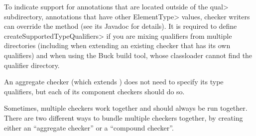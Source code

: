 To indicate support for annotations that are located outside of the \<qual>
subdirectory, annotations that have other \<ElementType> values,
checker writers can override the
method (see its Javadoc for details).
It is required to define \<createSupportedTypeQualifiers> if you are mixing
qualifiers from multiple directories (including when extending an existing
checker that has its own qualifiers) and when using the Buck build tool,
whose classloader cannot find the qualifier directory.

An aggregate checker (which extends
) does not need to specify its
type qualifiers, but each of its component checkers should do so.



Sometimes, multiple checkers work together and should always be run
together.  There are two different ways to bundle multiple checkers
together, by creating either an ``aggregate checker'' or a ``compound checker''.


